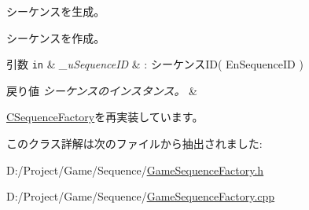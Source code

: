 シーケンスを生成。 

シーケンスを作成。


\begin{DoxyParams}[1]{引数}
\mbox{\tt in}  & {\em \+\_\+u\+Sequence\+I\+D} & \+: シーケンス\+I\+D( En\+Sequence\+I\+D ) \\
\hline
\end{DoxyParams}

\begin{DoxyRetVals}{戻り値}
{\em シーケンスのインスタンス。} & \\
\hline
\end{DoxyRetVals}


\hyperlink{class_c_sequence_factory_aba3a273d0da93264b7d18e43d86d4c39}{C\+Sequence\+Factory}を再実装しています。



このクラス詳解は次のファイルから抽出されました\+:\begin{DoxyCompactItemize}
\item 
D\+:/\+Project/\+Game/\+Sequence/\hyperlink{_game_sequence_factory_8h}{Game\+Sequence\+Factory.\+h}\item 
D\+:/\+Project/\+Game/\+Sequence/\hyperlink{_game_sequence_factory_8cpp}{Game\+Sequence\+Factory.\+cpp}\end{DoxyCompactItemize}
